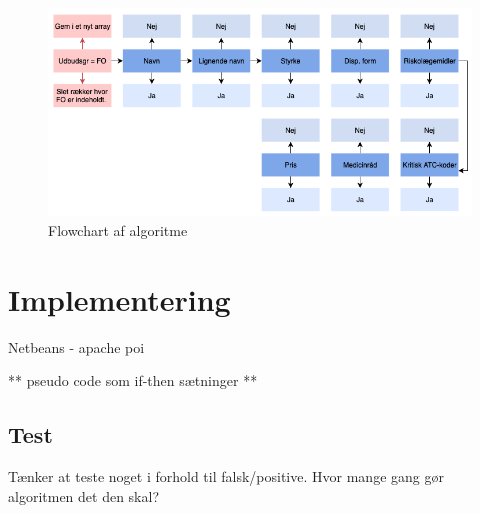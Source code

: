 \begin{figure}[H]\centering	\includegraphics[width=1\textwidth]{billeder/algoritme.png} 
	\caption{Flowchart af algoritme}
	\label{fig:metode}  
\end{figure}
\vspace{-0.5cm}


\chapter{Implementering}
Netbeans - apache poi

** pseudo code som if-then sætninger **


\section{Test}
Tænker at teste noget i forhold til falsk/positive. Hvor mange gang gør algoritmen det den skal?

